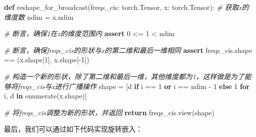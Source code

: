 \documentclass[
]{article}
\newenvironment{Shaded}{}{}
\newcommand{\BuiltInTok}[1]{\textcolor[rgb]{0.00,0.50,0.00}{#1}}
\newcommand{\CommentTok}[1]{\textcolor[rgb]{0.38,0.63,0.69}{\textit{#1}}}
\newcommand{\ControlFlowTok}[1]{\textcolor[rgb]{0.00,0.44,0.13}{\textbf{#1}}}
\newcommand{\DecValTok}[1]{\textcolor[rgb]{0.25,0.63,0.44}{#1}}
\newcommand{\KeywordTok}[1]{\textcolor[rgb]{0.00,0.44,0.13}{\textbf{#1}}}
\newcommand{\NormalTok}[1]{#1}
\newcommand{\OperatorTok}[1]{\textcolor[rgb]{0.40,0.40,0.40}{#1}}
\begin{document}
\begin{Shaded}
\begin{Highlighting}[]
\KeywordTok{def}\NormalTok{ reshape\_for\_broadcast(freqs\_cis: torch.Tensor, x: torch.Tensor):}
    \CommentTok{\# 获取x的维度数}
\NormalTok{    ndim }\OperatorTok{=}\NormalTok{ x.ndim}
    
    \CommentTok{\# 断言，确保1在x的维度范围内}
    \ControlFlowTok{assert} \DecValTok{0} \OperatorTok{\textless{}=} \DecValTok{1} \OperatorTok{\textless{}}\NormalTok{ ndim}
    
    \CommentTok{\# 断言，确保freqs\_cis的形状与x的第二维和最后一维相同}
    \ControlFlowTok{assert}\NormalTok{ freqs\_cis.shape }\OperatorTok{==}\NormalTok{ (x.shape[}\DecValTok{1}\NormalTok{], x.shape[}\OperatorTok{{-}}\DecValTok{1}\NormalTok{])}
    
    \CommentTok{\# 构造一个新的形状，除了第二维和最后一维，其他维度都为1，这样做是为了能够将freqs\_cis与x进行广播操作}
\NormalTok{    shape }\OperatorTok{=}\NormalTok{ [d }\ControlFlowTok{if}\NormalTok{ i }\OperatorTok{==} \DecValTok{1} \KeywordTok{or}\NormalTok{ i }\OperatorTok{==}\NormalTok{ ndim }\OperatorTok{{-}} \DecValTok{1} \ControlFlowTok{else} \DecValTok{1} \ControlFlowTok{for}\NormalTok{ i, d }\KeywordTok{in} \BuiltInTok{enumerate}\NormalTok{(x.shape)]}
    
    \CommentTok{\# 将freqs\_cis调整为新的形状，并返回}
    \ControlFlowTok{return}\NormalTok{ freqs\_cis.view(shape)}
\end{Highlighting}
\end{Shaded}

最后，我们可以通过如下代码实现旋转嵌入：
\end{document}
